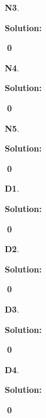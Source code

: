 \documentclass{article}
\newenvironment{problem}[1]
{
  \begin{flushleft}
  \textbf{#1}.
  \ignorespaces
}
{
  \end{flushleft}
}
\newenvironment{solution}
{
  \ignorespaces
  \textbf{Solution:}
}
{
  \ignorespacesafterend
  \begin{flushright}
  {\bfseries \qed}
  \end{flushright}
}
\begin{document}
\begin{problem}{N3}

\end{problem}
\begin{solution}

\end{solution}

\begin{problem}{N4}

\end{problem}
\begin{solution}

\end{solution}

\begin{problem}{N5}

\end{problem}
\begin{solution}

\end{solution}


\begin{problem}{D1}

\end{problem}
\begin{solution}

\end{solution}

\begin{problem}{D2}

\end{problem}
\begin{solution}

\end{solution}

\begin{problem}{D3}

\end{problem}
\begin{solution}

\end{solution}

\begin{problem}{D4}

\end{problem}
\begin{solution}

\end{solution}
\end{document}
